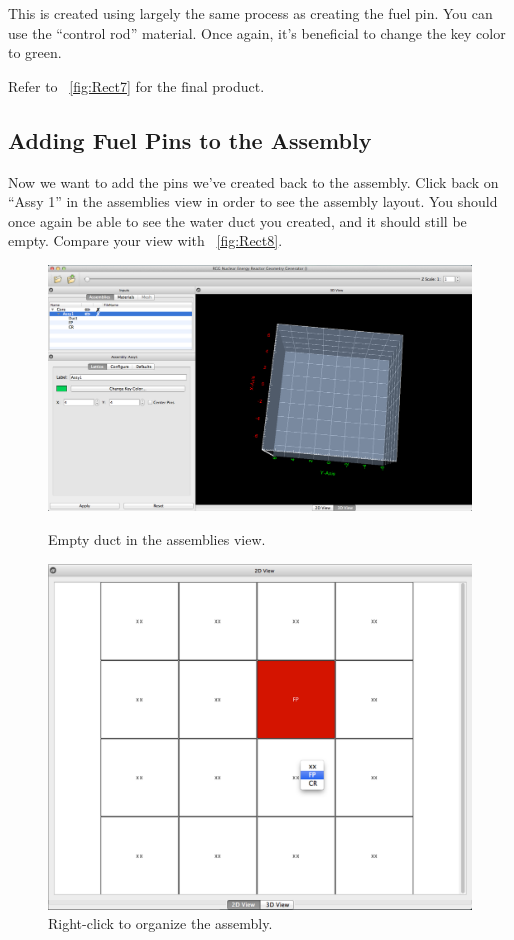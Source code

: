 This is created using largely the same process as creating the fuel pin.  You can use the ``control rod'' material.  Once again, it's beneficial to change the key color to green.

Refer to ~\ref{fig:Rect7} for the final product.
\clearpage
\subsection{Adding Fuel Pins to the Assembly}

Now we want to add the pins we've created back to the assembly.  Click back on ``Assy 1'' in the assemblies view in order to see the assembly layout.  You should once again be able to see the water duct you created, and it should still be empty.  Compare your view with ~\ref{fig:Rect8}.

\begin{figure}
\centering
\begin{minipage}{.5\textwidth}
  \centering
  \includegraphics[width=0.8\linewidth]{Images/rect-empty-assy.png}
\caption{Empty duct in the assemblies view.}
\label{fig:Rect8}
\end{minipage}%
\begin{minipage}{.5\textwidth}
  \centering
 \includegraphics[width=0.8\linewidth]{Images/rect-assign-pin.png}
\caption{Right-click to organize the assembly.}
\label{fig:Rect9}
\end{minipage}
\end{figure}

